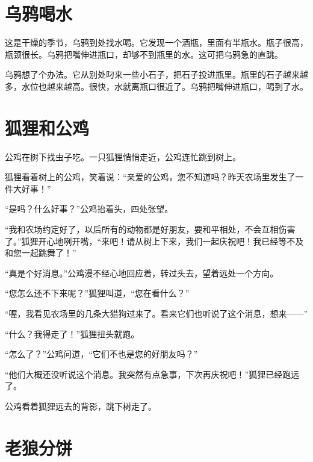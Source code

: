 \documentclass[12pt,UTF-8,openany]{ctexbook}
\begin{document}
\chapter{乌鸦喝水}

\begin{large}
    
    这是干燥的季节，乌鸦到处找水喝。它发现一个酒瓶，里面有半瓶水。瓶子很高，瓶颈很长。乌鸦把嘴伸进瓶口，却够不到瓶里的水。这可把乌鸦急的直跳。
    
    乌鸦想了个办法。它从别处叼来一些小石子，把石子投进瓶里。瓶里的石子越来越多，水位也越来越高。很快，水就离瓶口很近了。乌鸦把嘴伸进瓶口，喝到了水。
    
\end{large}



\chapter{狐狸和公鸡}

\begin{large}
    
    公鸡在树下找虫子吃。一只狐狸悄悄走近，公鸡连忙跳到树上。
    
    狐狸看着树上的公鸡，笑着说：“亲爱的公鸡，您不知道吗？昨天农场里发生了一件大好事！”
    
    “是吗？什么好事？”公鸡抬着头，四处张望。
    
    “我和农场约定好了，以后所有的动物都是好朋友，要和平相处，不会互相伤害了。”狐狸开心地咧开嘴，“来吧！请从树上下来，我们一起庆祝吧！我已经等不及和您一起跳舞了！”
    
    “真是个好消息。”公鸡漫不经心地回应着，转过头去，望着远处一个方向。
    
    “您怎么还不下来呢？”狐狸叫道，“您在看什么？”
    
    “喔，我看见农场里的几条大猎狗过来了。看来它们也听说了这个消息，想来——”
    
    “什么？我得走了！”狐狸扭头就跑。
    
    “怎么了？”公鸡问道，“它们不也是您的好朋友吗？”
    
    “他们大概还没听说这个消息。我突然有点急事，下次再庆祝吧！”狐狸已经跑远了。
    
    公鸡看着狐狸远去的背影，跳下树走了。
    
\end{large}



\chapter{老狼分饼}
\end{document}
